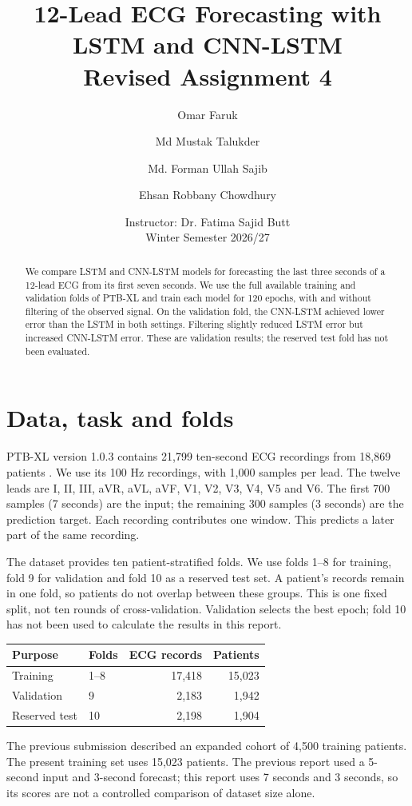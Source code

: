 \documentclass[11pt,a4paper]{article}
\title{12-Lead ECG Forecasting with LSTM and CNN-LSTM\\\large Revised Assignment 4}
\author{Omar Faruk \and Md Mustak Talukder \and Md. Forman Ullah Sajib \and Ehsan Robbany Chowdhury}
\date{Instructor: Dr. Fatima Sajid Butt\\Winter Semester 2026/27}
\begin{document}
\maketitle
\begin{abstract}
We compare LSTM and CNN-LSTM models for forecasting the last three seconds of a 12-lead ECG from its first seven seconds. We use the full available training and validation folds of PTB-XL and train each model for 120 epochs, with and without filtering of the observed signal. On the validation fold, the CNN-LSTM achieved lower error than the LSTM in both settings. Filtering slightly reduced LSTM error but increased CNN-LSTM error. These are validation results; the reserved test fold has not been evaluated.
\end{abstract}
\section{Data, task and folds}
PTB-XL version 1.0.3 contains 21,799 ten-second ECG recordings from 18,869 patients \cite{ptbxl}. We use its 100 Hz recordings, with 1,000 samples per lead. The twelve leads are I, II, III, aVR, aVL, aVF, V1, V2, V3, V4, V5 and V6. The first 700 samples (7 seconds) are the input; the remaining 300 samples (3 seconds) are the prediction target. Each recording contributes one window. This predicts a later part of the same recording.

The dataset provides ten patient-stratified folds. We use folds 1--8 for training, fold 9 for validation and fold 10 as a reserved test set. A patient's records remain in one fold, so patients do not overlap between these groups. This is one fixed split, not ten rounds of cross-validation. Validation selects the best epoch; fold 10 has not been used to calculate the results in this report.
\begin{center}
\begin{tabular}{llrr}\toprule
Purpose & Folds & ECG records & Patients \\\midrule
Training & 1--8 & 17,418 & 15,023 \\
Validation & 9 & 2,183 & 1,942 \\
Reserved test & 10 & 2,198 & 1,904 \\\bottomrule
\end{tabular}
\end{center}
The previous submission described an expanded cohort of 4,500 training patients. The present training set uses 15,023 patients. The previous report used a 5-second input and 3-second forecast; this report uses 7 seconds and 3 seconds, so its scores are not a controlled comparison of dataset size alone.
\end{document}
